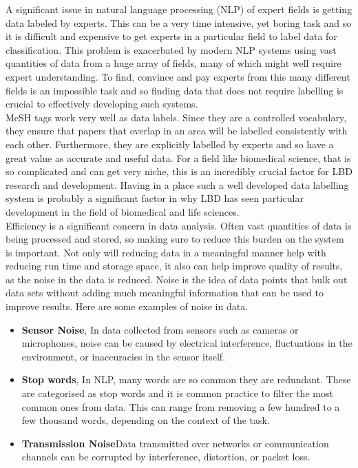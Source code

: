 \documentclass{l4proj}
\begin{document}
 A significant issue in natural language processing (NLP) of expert fields is getting data labeled by experts. This can be a very time intensive, yet boring task and so it is difficult and expensive to get experts in a particular field to label data for classification. This problem is exacerbated by modern NLP systems using vast quantities of data from a huge array of fields, many of which might well require expert understanding. To find, convince and pay experts from this many different fields is an impossible task and so finding data that does not require labelling is crucial to effectively developing such systems. \\
 
 MeSH tags work very well as data labels. Since they are a controlled vocabulary, they ensure that papers that overlap in an area will be labelled consistently with each other. Furthermore, they are explicitly labelled by experts and so have a great value as accurate and useful data. For a field like biomedical science, that is so complicated and can get very niche, this is an incredibly crucial factor for LBD research and development. Having in a place such a well developed data labelling system is probably a significant factor in why LBD has seen particular development in the field of biomedical and life sciences. \\

 Efficiency is a significant concern in data analysis. Often vast quantities of data is being processed and stored, so making sure to reduce this burden on the system is important. Not only will reducing data in a meaningful manner help with reducing run time and storage space, it also can help improve quality of results, as the noise in the data is reduced. Noise is the idea of data points that bulk out data sets without adding much meaningful information that can be used to improve results. Here are some examples of noise in data.
\\ 
\begin{itemize}
    \item \textbf{Sensor Noise}, In data collected from sensors such as cameras or microphones, noise can be caused by electrical interference, fluctuations in the environment, or inaccuracies in the sensor itself. 
    \item \textbf{Stop words}, In NLP, many words are so common they are redundant. These are categorised as stop words and it is common practice to filter the most common ones from data. This can range from removing a few hundred to a few thousand words, depending on the context of the task.
    \item \textbf{Transmission Noise}Data transmitted over networks or communication channels can be corrupted by interference, distortion, or packet loss. \\
\end{itemize}
\end{document}
